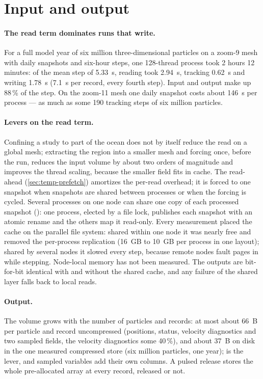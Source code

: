 \section{Input and output}\label{sec:perf-io}

\paragraph{The read term dominates runs that write.} For a full model year of six million
three-dimensional particles on a zoom-9 mesh with daily snapshots and six-hour steps, one 128-thread
process took 2 hours 12 minutes: of the mean step of \SI{5.33}{s}, reading took \SI{2.94}{s},
tracking \SI{0.62}{s} and writing \SI{1.78}{s} (\SI{7.1}{s} per record, every fourth step). Input and
output make up 88\,\% of the step. On the zoom-11 mesh one daily snapshot costs about \SI{146}{s} per
process --- as much as some 190 tracking steps of six million particles.

\paragraph{Levers on the read term.} Confining a study to part of the ocean does not by itself
reduce the read on a global mesh; extracting the region into a smaller mesh and forcing once, before
the run, reduces the input volume by about two orders of magnitude and improves the thread scaling,
because the smaller field fits in cache. The read-ahead (\cref{sec:temp-prefetch}) amortizes the
per-read overhead; it is forced to one snapshot when snapshots are shared between processes or when
the forcing is cycled. Several processes on one node can share one copy of each processed snapshot
(): one process, elected by a file lock, publishes each snapshot
with an atomic rename and the others map it read-only. Every measurement placed the cache on the
parallel file system: shared within one node it was nearly free and removed the per-process replication
(\SI{16}{GB} to \SI{10}{GB} per process in one layout); shared by several nodes it slowed every step,
because remote nodes fault pages in while stepping. Node-local memory has not been measured. The outputs are bit-for-bit identical with and without the shared
cache, and any failure of the shared layer falls back to local reads.

\paragraph{Output.} The volume grows with the number of particles and records: at most about \SI{66}{B} per
particle and record uncompressed (positions, status, velocity diagnostics and two sampled fields, the
velocity diagnostics some 40\,\%), and about \SI{37}{B} on disk in the one measured compressed store
(six million particles, one year);  is the
lever, and sampled variables add their own columns. A pulsed release stores the whole pre-allocated
array at every record, released or not.

